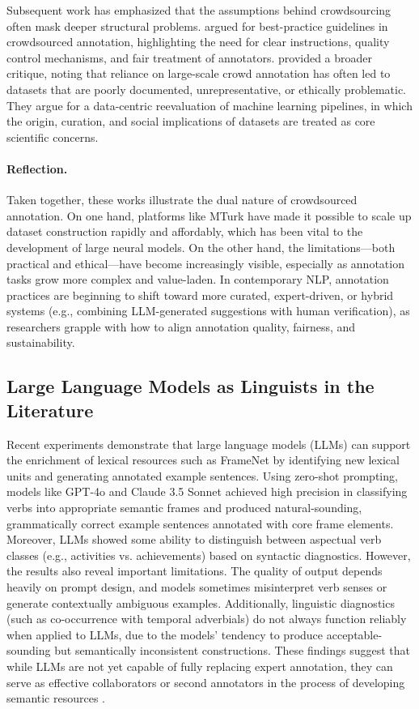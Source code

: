 Subsequent work has emphasized that the assumptions behind crowdsourcing often mask deeper structural problems. \citet{sabou2014corpus} argued for best-practice guidelines in crowdsourced annotation, highlighting the need for clear instructions, quality control mechanisms, and fair treatment of annotators. \citet{paullada2021data} provided a broader critique, noting that reliance on large-scale crowd annotation has often led to datasets that are poorly documented, unrepresentative, or ethically problematic. They argue for a data-centric reevaluation of machine learning pipelines, in which the origin, curation, and social implications of datasets are treated as core scientific concerns.

\paragraph{Reflection.} Taken together, these works illustrate the dual nature of crowdsourced annotation. On one hand, platforms like MTurk have made it possible to scale up dataset construction rapidly and affordably, which has been vital to the development of large neural models. On the other hand, the limitations—both practical and ethical—have become increasingly visible, especially as annotation tasks grow more complex and value-laden. In contemporary NLP, annotation practices are beginning to shift toward more curated, expert-driven, or hybrid systems (e.g., combining LLM-generated suggestions with human verification), as researchers grapple with how to align annotation quality, fairness, and sustainability.

\subsection{Large Language Models as Linguists in the Literature}
Recent experiments demonstrate that large language models (LLMs) can support the enrichment of lexical resources such as FrameNet by identifying new lexical units and generating annotated example sentences. Using zero-shot prompting, models like GPT-4o and Claude 3.5 Sonnet achieved high precision in classifying verbs into appropriate semantic frames and produced natural-sounding, grammatically correct example sentences annotated with core frame elements. Moreover, LLMs showed some ability to distinguish between aspectual verb classes (e.g., activities vs. achievements) based on syntactic diagnostics. However, the results also reveal important limitations. The quality of output depends heavily on prompt design, and models sometimes misinterpret verb senses or generate contextually ambiguous examples. Additionally, linguistic diagnostics (such as co-occurrence with temporal adverbials) do not always function reliably when applied to LLMs, due to the models' tendency to produce acceptable-sounding but semantically inconsistent constructions. These findings suggest that while LLMs are not yet capable of fully replacing expert annotation, they can serve as effective collaborators or second annotators in the process of developing semantic resources \citep{koeva2024}.

